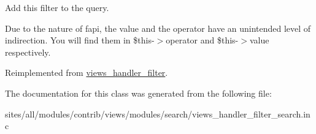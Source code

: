 Add this filter to the query.

Due to the nature of fapi, the value and the operator have an unintended level of indirection. You will find them in \$this-$>$operator and \$this-$>$value respectively. 

Reimplemented from \hyperlink{classviews__handler__filter_8e513b3abbc2559f37b550ca4957b4ae}{views\_\-handler\_\-filter}.

The documentation for this class was generated from the following file:\begin{CompactItemize}
\item 
sites/all/modules/contrib/views/modules/search/views\_\-handler\_\-filter\_\-search.inc\end{CompactItemize}
